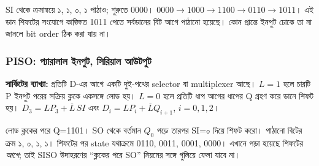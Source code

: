 SI থেকে ক্রমান্বয়ে ১, ১, ০, ১ পাঠাও; শুরুতে 0000।
\chThreeAnswer $0000\to1000\to1100\to0110\to1011$। এই ডান শিফটের সংযোগে কাঙ্ক্ষিত 1011 পেতে সর্বডানের বিট আগে পাঠানো হয়েছে। কোন প্রান্তে ইনপুট ঢোকে তা না জানলে bit order ঠিক করা যায় না।

\subsubsection*{PISO: প্যারালাল ইনপুট, সিরিয়াল আউটপুট}
\begin{center}
\begin{minipage}{\linewidth}\centering\begin{chThreeDiagram}\end{chThreeDiagram}

\end{minipage}
\end{center}
\noindent\textbf{সার্কিটের ব্যাখ্যা:} প্রতিটি D-এর আগে একটি দুই-পথের selector বা multiplexer আছে। $L=1$ হলে চারটি P ইনপুট পরের সক্রিয় ক্লকে একসঙ্গে লোড হয়। $L=0$ হলে প্রতিটি ধাপ আগের ধাপের Q গ্রহণ করে ডানে শিফট হয়। $D_3=LP_3+\overline L\,SI$ এবং $D_i=LP_i+\overline LQ_{i+1}$, $i=0,1,2$।

লোড ক্লকের পরে Q=1101। SO থেকে বর্তমান $Q_0$ পড়ে তারপর SI=০ দিয়ে শিফট করো।
\chThreeAnswer পাঠানো বিটের ক্রম ১, ০, ১, ১। শিফটের পর state যথাক্রমে 0110, 0011, 0001, 0000। এখানে পড়া হয়েছে শিফটের \emph{আগে}; তাই SISO উদাহরণের ``ক্লকের পরে SO'' নিয়মের সঙ্গে গুলিয়ে ফেলা যাবে না।

